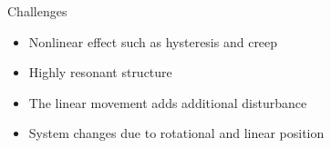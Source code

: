\documentclass[10pt]{beamer}
\begin{document}
\begin{frame}[fragile]{Challenges}
  \begin{itemize}
    \item Nonlinear effect such as hysteresis and creep
    \item Highly resonant structure
    \item The linear movement adds additional disturbance
    \item System changes due to rotational and linear position
  \end{itemize}
  \vspace{-0.7cm}
  \begin{figure}[h]
    \centering %
    \qquad
  \end{figure}
\end{frame}
\end{document}
